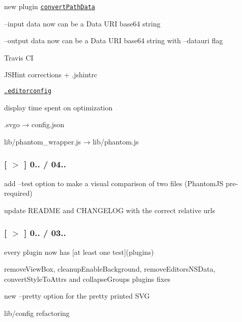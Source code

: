 \begin{DoxyItemize}
\item new plugin \href{plugins/convertPathData.js}{\tt convert\+Path\+Data}
\item --input data now can be a Data U\+RI base64 string
\item --output data now can be a Data U\+RI base64 string with --datauri flag
\item Travis CI
\item J\+S\+Hint corrections + .jshintrc
\item \href{http://editorconfig.org/}{\tt .editorconfig}
\item display time spent on optimization
\item .svgo → config.\+json
\item lib/phantom\+\_\+wrapper.\+js → lib/phantom.\+js
\end{DoxyItemize}

\subsubsection*{\mbox{[} \href{https://github.com/svg/svgo/tree/v0.0.6}{\tt $>$} \mbox{]} 0.. / 04..}


\begin{DoxyItemize}
\item add --test option to make a visual comparison of two files (Phantom\+JS pre-\/required)
\item update R\+E\+A\+D\+ME and C\+H\+A\+N\+G\+E\+L\+OG with the correct relative urls
\end{DoxyItemize}

\subsubsection*{\mbox{[} \href{https://github.com/svg/svgo/tree/v0.0.5}{\tt $>$} \mbox{]} 0.. / 03..}


\begin{DoxyItemize}
\item every plugin now has \mbox{[}at least one test\mbox{]}(plugins)
\item remove\+View\+Box, cleanup\+Enable\+Background, remove\+Editors\+N\+S\+Data, convert\+Style\+To\+Attrs and collapse\+Groups plugins fixes
\item new --pretty option for the pretty printed S\+VG
\item lib/config refactoring
\end{DoxyItemize}

